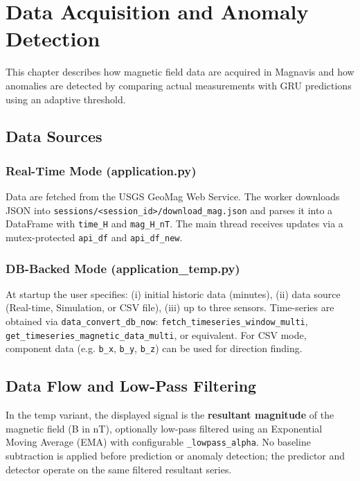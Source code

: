 \chapter{Data Acquisition and Anomaly Detection}
\label{Chapter4}

This chapter describes how magnetic field data are acquired in Magnavis and how anomalies are detected by comparing actual measurements with GRU predictions using an adaptive threshold.

\section{Data Sources}
\subsection{Real-Time Mode (application.py)}
Data are fetched from the USGS GeoMag Web Service. The worker downloads JSON into \texttt{sessions/<session\_id>/download\_mag.json} and parses it into a DataFrame with \texttt{time\_H} and \texttt{mag\_H\_nT}. The main thread receives updates via a mutex-protected \texttt{api\_df} and \texttt{api\_df\_new}.

\subsection{DB-Backed Mode (application\_temp.py)}
At startup the user specifies: (i) initial historic data (minutes), (ii) data source (Real-time, Simulation, or CSV file), (iii) up to three sensors. Time-series are obtained via \texttt{data\_convert\_db\_now}: \texttt{fetch\_timeseries\_window\_multi}, \texttt{get\_timeseries\_magnetic\_data\_multi}, or equivalent. For CSV mode, component data (e.g. \texttt{b\_x}, \texttt{b\_y}, \texttt{b\_z}) can be used for direction finding.

\section{Data Flow and Low-Pass Filtering}
In the temp variant, the displayed signal is the \textbf{resultant magnitude} of the magnetic field (B in nT), optionally low-pass filtered using an Exponential Moving Average (EMA) with configurable \texttt{\_lowpass\_alpha}. No baseline subtraction is applied before prediction or anomaly detection; the predictor and detector operate on the same filtered resultant series.

